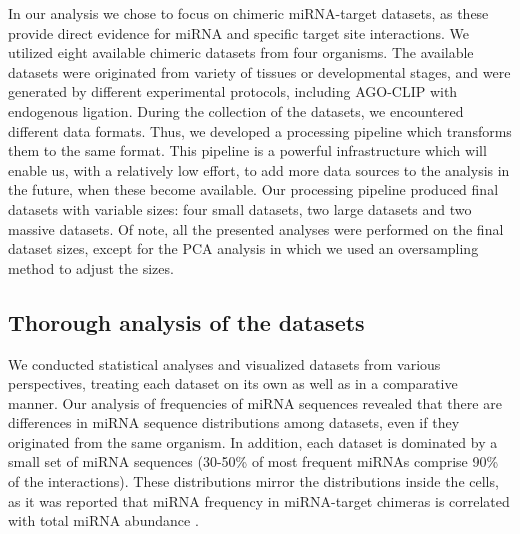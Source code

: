 \documentclass{bmcart}
\begin{document}
In our analysis we chose to focus on chimeric miRNA-target datasets, as these provide direct evidence for miRNA and specific target site interactions. We utilized eight available chimeric datasets from four organisms. The available datasets were originated from variety of tissues or developmental stages, and were generated by different experimental protocols, including AGO-CLIP with endogenous ligation. During the collection of the datasets, we encountered different data formats. Thus, we developed a processing pipeline which transforms them to the same format. This pipeline is a powerful infrastructure which will enable us, with a relatively low effort, to add more data sources to the analysis in the future, when these become available. 
Our processing pipeline produced final datasets with variable sizes: four small datasets, two large datasets and two massive datasets. Of note, all the presented analyses were performed on the final dataset sizes, except for the PCA analysis in which we used an oversampling method to adjust the sizes.

\subsection*{Thorough analysis of the datasets}
We conducted statistical analyses and visualized datasets from various perspectives, treating each dataset on its own as well as in a comparative manner. 
Our analysis of frequencies of miRNA sequences revealed that there are differences in miRNA sequence distributions among datasets, even if they originated from the same organism. In addition, each dataset is dominated by a small set of miRNA sequences (30-50\% of most frequent miRNAs comprise 90\% of the interactions). These distributions mirror the distributions inside the cells, as it was reported that miRNA frequency in miRNA-target chimeras is correlated with total miRNA abundance \cite{darnell_moore2015mirna}.
\end{document}

